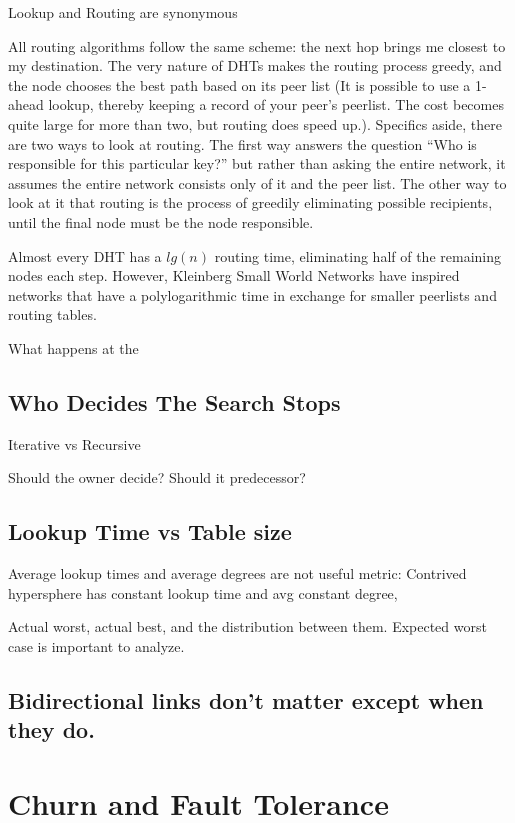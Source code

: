 \documentclass[10pt,letterpaper]{report}
\begin{document}
Lookup and Routing are synonymous

All routing algorithms follow the same scheme:  the next hop  brings me closest to my destination.  The very nature of DHTs makes the routing process greedy, and the node chooses the best path based on its peer list (It is possible to use a 1-ahead lookup, thereby keeping a record of your peer's peerlist.  The cost becomes quite large for more than two, but routing does speed up.).  Specifics aside, there are two ways to look at routing.  The first way  answers the question ``Who is responsible for this particular key?''  but rather than asking the entire network, it assumes the entire network consists only of it and the peer list.  The other way to look at it that routing is the process of greedily  eliminating possible recipients, until the final node must be the node responsible.  

Almost every DHT has a $lg(n)$ routing time, eliminating  half of the remaining nodes each step.
However, Kleinberg Small World Networks have inspired networks that have a polylogarithmic time in exchange for smaller peerlists and routing tables.

What happens at the 


\subsection{Who Decides The Search Stops}
Iterative vs Recursive

Should the owner decide?  Should it predecessor?

\subsection{Lookup Time vs Table size}

Average lookup times and average degrees are not useful metric:
Contrived hypersphere has constant lookup time and avg constant degree,



Actual worst, actual best, and the distribution between them.  Expected worst case is important to analyze.

\subsection{Bidirectional links don't matter except when they do.}

\section{Churn and Fault Tolerance}  %
\end{document}

